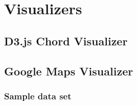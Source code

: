 \chapter{Visualizers}

\section{D3.js Chord Visualizer}

\section{Google Maps Visualizer}

\subsection{Sample data set}
